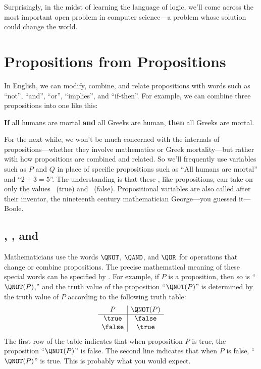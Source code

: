 Surprisingly, in the midst of learning the language of logic, we'll come
across the most important open problem in computer science---a problem
whose solution could change the world.


\section{Propositions from Propositions}\label{propform_sec}

In English, we can modify, combine, and relate propositions with words
such as ``not'', ``and'', ``or'', ``implies'', and ``if-then''.
For example, we can combine three propositions into one like this:
%
\begin{center}
\textbf{If} all humans are mortal \textbf{and} all Greeks are human,
\textbf{then} all Greeks are mortal.
\end{center}

For the next while, we won't be much concerned with the internals of
propositions---whether they involve mathematics or Greek mortality---but
rather with how propositions are combined and related.  So we'll
frequently use variables such as $P$ and $Q$ in place of specific
propositions such as ``All humans are mortal'' and ``$2 + 3 = 5$''.  The
understanding is that these , like
propositions, can take on only the values \true~(true) and \false~(false).
Propositional variables are also called  after
their inventor, the nineteenth century mathematician George---you guessed
it---Boole.

\subsection{\QNOT, \QAND, and \QOR}
Mathematicians use the words $\QNOT$, $\QAND$, and $\QOR$
for operations that change or combine propositions.  The precise
mathematical meaning of these special words can be specified by
.  For example, if $P$ is a proposition,
then so is ``$\QNOT(P)$,'' and the truth value of the proposition
``$\QNOT(P)$'' is determined by the truth value of $P$ according to the
following truth table:
%
\[
\begin{array}{c|c}
P & \QNOT(P) \\ \hline
\true & \false \\
\false & \true \\
\end{array}
\]
%
The first row of the table indicates that when proposition $P$ is true,
the proposition ``$\QNOT(P)$'' is false.  The second line indicates that
when $P$ is false, ``$\QNOT(P)$'' is true.  This is probably what you
would expect.

